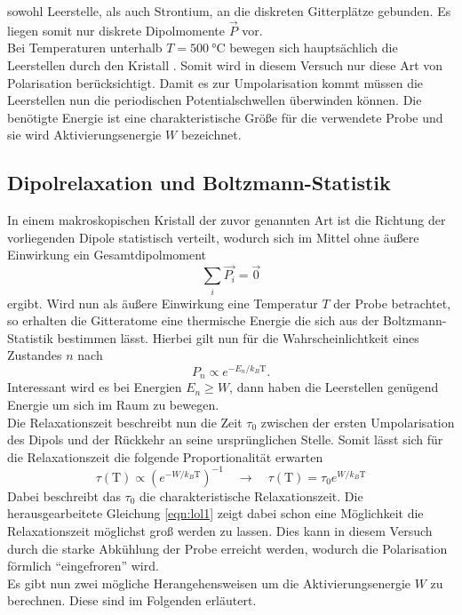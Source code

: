 sowohl Leerstelle, als auch Strontium, an die diskreten Gitterplätze gebunden. Es liegen somit nur diskrete Dipolmomente $\vec{P}$ vor.
\\
Bei Temperaturen unterhalb $T = \SI{500}{\celsius}$ bewegen sich hauptsächlich die Leerstellen durch den Kristall \cite{altskript}. Somit wird in diesem Versuch nur diese Art von Polarisation berücksichtigt.
Damit es zur Umpolarisation kommt müssen die Leerstellen nun die periodischen Potentialschwellen überwinden können. Die benötigte Energie ist eine charakteristische Größe für die verwendete Probe und 
sie wird Aktivierungsenergie $W$ bezeichnet.

\subsection{Dipolrelaxation und Boltzmann-Statistik}
In einem makroskopischen Kristall der zuvor genannten Art ist die Richtung der vorliegenden Dipole statistisch verteilt, wodurch sich im Mittel ohne äußere Einwirkung ein Gesamtdipolmoment
\begin{equation*}
\sum_{i} \vec{P_{i}} = \vec{0}
\end{equation*}
ergibt. Wird nun als äußere Einwirkung eine Temperatur $T$ der Probe betrachtet, so erhalten die Gitteratome eine thermische Energie die sich aus der Boltzmann-Statistik bestimmen lässt.
Hierbei gilt nun für die Wahrscheinlichtkeit eines Zustandes $n$ nach \cite{Briels2016}
\begin{equation*}
P_n \propto e^{- E_n / k_{B}\text{T}}.
\end{equation*}
Interessant wird es bei Energien $E_n \geq W$, dann haben die Leerstellen genügend Energie um sich im Raum zu bewegen.
\\
Die Relaxationszeit beschreibt nun die Zeit $\tau_0$ zwischen der ersten Umpolarisation des Dipols und der Rückkehr an seine ursprünglichen Stelle.
Somit lässt sich für die Relaxationszeit die folgende Proportionalität erwarten
\begin{equation}
    \label{eqn:lol1}
\tau(\text{T}) \propto  \left( e^{- W / k_{B}\text{T}}\right)^{-1} \quad \to \quad \tau(\text{T}) = \tau_0  e^{ W / k_{B}\text{T}}
\end{equation}
Dabei beschreibt das $\tau_0$ die charakteristische Relaxationszeit.
Die herausgearbeitete Gleichung \eqref{eqn:lol1} zeigt dabei schon eine Möglichkeit die Relaxationszeit möglichst groß werden zu lassen. Dies kann in diesem Versuch durch die starke Abkühlung der Probe
erreicht werden, wodurch die Polarisation förmlich \enquote{eingefroren} wird.
\\
Es gibt nun zwei mögliche Herangehensweisen um die Aktivierungsenergie $W$ zu berechnen. Diese sind im Folgenden erläutert.

